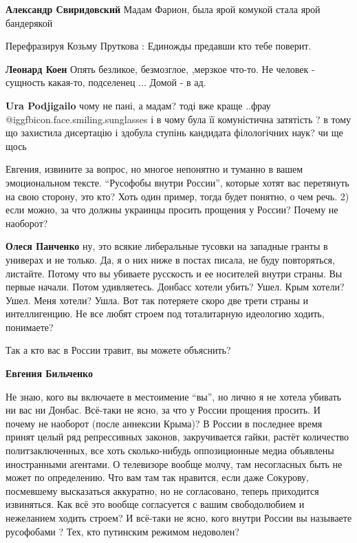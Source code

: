 \begin{itemize}
\begin{itemize}
\textbf{Александр Свиридовский} Мадам Фарион, была ярой комукой стала ярой бандерякой

Перефразируя Козьму Пруткова :
Единожды предавши кто тебе поверит.

\textbf{Леонард Коен}
Опять безликое, безмозглое,
,мерзкое что-то.
Не человек - сущность какая-то, подселенец ...
Домой - в ад.

\textbf{Ura Podjigailo} чому не пані, а мадам? тоді вже краще ..фрау @igg{fbicon.face.smiling.sunglasses}  і в чому була її комуністична затятість ? в тому що захистила дисертацію і здобула ступінь кандидата філологічних наук? чи ще щось

\end{itemize} %

Евгения, извините за вопрос, но многое непонятно и туманно в вашем эмоциональном тексте.
\enquote{Русофобы внутри России}, которые хотят вас перетянуть на свою сторону, это кто?
Хоть один пример, тогда будет понятно, о чем речь.
2) если можно, за что должны украинцы просить прощения у России?
Почему не наоборот?

\begin{itemize} %
\textbf{Олеся Панченко} ну, это всякие либеральные тусовки на западные гранты в универах и не только. Да, я о них ниже в постах писала, не буду повторяться, листайте. Потому что вы убиваете русскость и ее носителей внутри страны. Вы первые начали. Потом удивляетесь. Донбасс хотели убить? Ушел. Крым хотели? Ушел. Меня хотели? Ушла. Вот так потеряете скоро две трети страны и интеллигенцию. Не все любят строем под тоталитарную идеологию ходить, понимаете?

Так а кто вас в России травит, вы можете объяснить?

\textbf{Евгения Бильченко} 

Не знаю, кого вы включаете в местоимение \enquote{вы}, но лично я не хотела убивать ни вас ни Донбас.
Всё-таки не ясно, за что у России прощения просить.
И почему не наоборот (после аннексии Крыма)?
В России в последнее время принят целый ряд репрессивных законов, закручивается гайки,
растёт количество политзаключенных, все хоть сколько-нибудь оппозиционные медиа объявлены иностранными агентами.
О телевизоре вообще молчу, там несогласных быть не может по определению.
Что вам там так нравится, если даже Сокурову, посмевшему высказаться аккуратно, но не согласовано, теперь приходится извиняться.
Как всё это вообще согласуется с вашим свободолюбием и нежеланием ходить строем?
И всё-таки не ясно, кого внутри России вы называете русофобами ?
Тех, кто путинским режимом недоволен?


\end{itemize}
\end{itemize}
